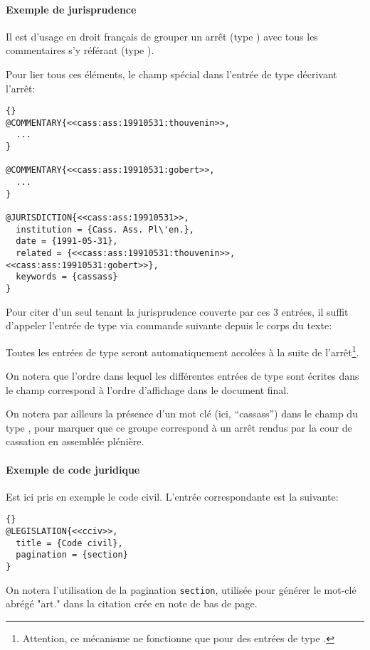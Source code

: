 \documentclass{ltxdockit}
\begin{document}
\paragraph{Exemple de jurisprudence}
\label{templatejurisprudence}

Il est d'usage en droit français de grouper un arrêt (type ) avec tous les commentaires s'y référant (type ). 

Pour lier tous ces éléments, le champ spécial  dans l'entrée de type  décrivant l'arrêt:
\begin{lstlisting}[style=bibtex]{}	
@COMMENTARY{<<cass:ass:19910531:thouvenin>>,
  ...
}

@COMMENTARY{<<cass:ass:19910531:gobert>>,
  ...
}

@JURISDICTION{<<cass:ass:19910531>>,
  institution = {Cass. Ass. Pl\'en.},
  date = {1991-05-31},
  related = {<<cass:ass:19910531:thouvenin>>, <<cass:ass:19910531:gobert>>},
  keywords = {cassass}
}
\end{lstlisting}
%
Pour citer d'un seul tenant la jurisprudence couverte par ces 3 entrées, il suffit d'appeler l'entrée de type  via commande suivante depuis le corps du texte:
%

Toutes les entrées de type  seront automatiquement accolées à la suite de l'arrêt\footnote{Attention, ce mécanisme ne fonctionne que pour des entrées de type .}.

On notera que l'ordre dans lequel les différentes entrées de type  sont écrites dans le champ  correspond à l'ordre d'affichage dans le document final.

On notera par ailleurs la présence d'un mot clé (ici, \enquote{cassass}) dans le champ  du type , pour marquer que ce groupe correspond à un arrêt rendus par la cour de cassation en assemblée plénière.

\paragraph{Exemple de code juridique}

Est ici pris en exemple le code civil. L'entrée correspondante est la suivante:
\begin{lstlisting}[style=bibtex]{}
@LEGISLATION{<<cciv>>,
  title = {Code civil},
  pagination = {section}
}
\end{lstlisting}
On notera l'utilisation de la pagination \texttt{section}, utilisée pour générer le mot-clé abrégé "art." dans la citation crée en note de bas de page.
\end{document}
